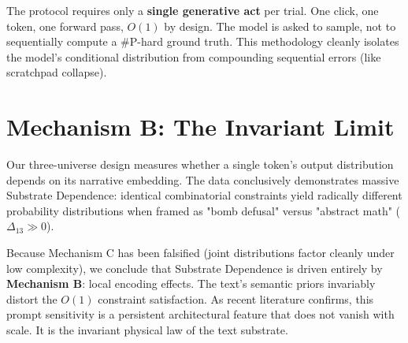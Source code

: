\documentclass[12pt,a4paper]{article}
\begin{document}
The protocol requires only a \textbf{single generative act} per trial. One click, one token, one forward pass, $O(1)$ by design. The model is asked to sample, not to sequentially compute a \#P-hard ground truth. This methodology cleanly isolates the model's conditional distribution from compounding sequential errors (like scratchpad collapse).

\section{Mechanism B: The Invariant Limit}

Our three-universe design measures whether a single token's output distribution depends on its narrative embedding.
The data conclusively demonstrates massive Substrate Dependence: identical combinatorial constraints yield radically different probability distributions when framed as "bomb defusal" versus "abstract math" ($\Delta_{13} \gg 0$).

Because Mechanism C has been falsified (joint distributions factor cleanly under low complexity), we conclude that Substrate Dependence is driven entirely by \textbf{Mechanism B}: local encoding effects. The text's semantic priors invariably distort the $O(1)$ constraint satisfaction. As recent literature confirms, this prompt sensitivity is a persistent architectural feature that does not vanish with scale. It is the invariant physical law of the text substrate.
\end{document}
